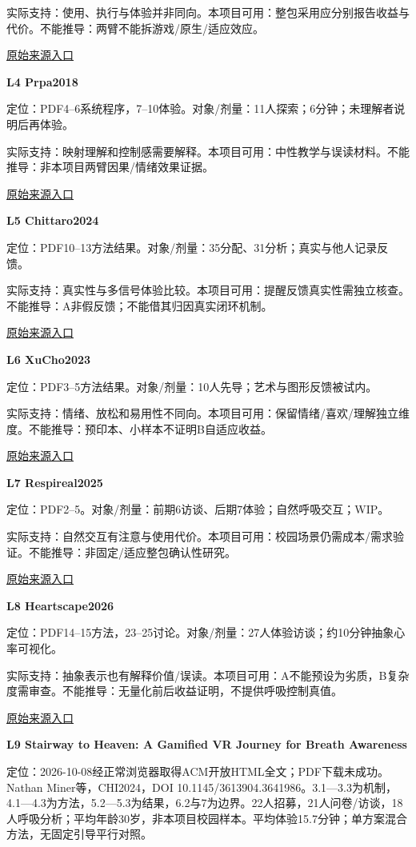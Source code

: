 \documentclass[11pt,a4paper]{article}
\newcommand{\reviewsubsection}[1]{\par\Needspace{4\baselineskip}\vspace{4pt}\begin{center}{\titlelatin\titlecjk\bfseries\fontsize{12}{18}\selectfont #1}\end{center}}
\begin{document}
实际支持：使用、执行与体验并非同向。本项目可用：整包采用应分别报告收益与代价。不能推导：两臂不能拆游戏/\allowbreak{}原生/\allowbreak{}适应效应。

\href{https://doi.org/10.3389/fdgth.2021.760268}{原始来源入口}

\reviewsubsection{6.4 L4 Prpa2018}
定位：PDF4–6系统程序，7–10体验。对象/\allowbreak{}剂量：11人探索；6分钟；未理解者说明后再体验。

实际支持：映射理解和控制感需要解释。本项目可用：中性教学与误读材料。不能推导：非本项目两臂因果/\allowbreak{}情绪效果证据。

\href{https://doi.org/10.1145/3196709.3196765}{原始来源入口}

\reviewsubsection{6.5 L5 Chittaro2024}
定位：PDF10–13方法结果。对象/\allowbreak{}剂量：35分配、31分析；真实与他人记录反馈。

实际支持：真实性与多信号体验比较。本项目可用：提醒反馈真实性需独立核查。不能推导：A非假反馈；不能借其归因真实闭环机制。

\href{https://doi.org/10.1016/j.ijhcs.2024.103275}{原始来源入口}

\reviewsubsection{6.6 L6 XuCho2023}
定位：PDF3–5方法结果。对象/\allowbreak{}剂量：10人先导；艺术与图形反馈被试内。

实际支持：情绪、放松和易用性不同向。本项目可用：保留情绪/\allowbreak{}喜欢/\allowbreak{}理解独立维度。不能推导：预印本、小样本不证明B自适应收益。

\href{https://arxiv.org/abs/2310.14343}{原始来源入口}

\reviewsubsection{6.7 L7 Respireal2025}
定位：PDF2–5。对象/\allowbreak{}剂量：前期6访谈、后期7体验；自然呼吸交互；WIP。

实际支持：自然交互有注意与使用代价。本项目可用：校园场景仍需成本/\allowbreak{}需求验证。不能推导：非固定/\allowbreak{}适应整包确认性研究。

\href{https://doi.org/10.1145/3715668.3736338}{原始来源入口}

\reviewsubsection{6.8 L8 Heartscape2026}
定位：PDF14–15方法，23–25讨论。对象/\allowbreak{}剂量：27人体验访谈；约10分钟抽象心率可视化。

实际支持：抽象表示也有解释价值/\allowbreak{}误读。本项目可用：A不能预设为劣质，B复杂度需审查。不能推导：无量化前后收益证明，不提供呼吸控制真值。

\href{https://doi.org/10.1080/10447318.2026.2669040}{原始来源入口}

\reviewsubsection{6.9 L9 Stairway to Heaven: A Gamified VR Journey for Breath Awareness}
定位：2026-10-08经正常浏览器取得ACM开放HTML全文；PDF下载未成功。Nathan Miner等，CHI2024，DOI 10.1145/3613904.3641986。3.1—3.3为机制，4.1—4.3为方法，5.2—5.3为结果，6.2与7为边界。22人招募，21人问卷/访谈，18人呼吸分析；平均年龄30岁，非本项目校园样本。平均体验15.7分钟；单方案混合方法，无固定引导平行对照。
\end{document}
